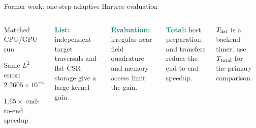 \documentclass[aspectratio=169,11pt]{beamer}
\begin{document}
\begin{frame}{Former work: one-step adaptive Hartree evaluation}
\begin{columns}[T,onlytextwidth]
\begin{block}{Matched CPU/GPU run}
        \vspace{-0.02cm}
        {\scriptsize
        Same $L^2$ error: $2.2605\times10^{-4}$\par
        \alert{\(1.65\times\) end-to-end speedup}}
      \end{block}
      \vspace{0.04cm}
      {\tiny
      \textcolor{teal}{\textbf{List:}} independent target traversals and flat
      CSR storage give a large kernel gain.\par
      \textcolor{teal}{\textbf{Evaluation:}} irregular near-field quadrature
      and memory access limit the gain.\par
      \textcolor{teal}{\textbf{Total:}} host preparation and transfers reduce
      the end-to-end speedup.\par
      \color{muted}$T_{\rm list}$ is a backend timer; use $T_{\rm total}$ for
      the primary comparison.}
  \end{columns}
\end{frame}
\end{document}
